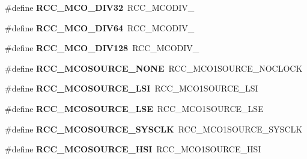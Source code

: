 \begin{DoxyCompactItemize}
\#define {\bfseries R\+C\+C\+\_\+\+M\+C\+O\+\_\+\+D\+I\+V32}~R\+C\+C\+\_\+\+M\+C\+O\+D\+I\+V\+\_
\item 
\mbox{\label{group___h_a_l___r_c_c___aliased_ga3e2f0bbc95937a013cdb3cc6bec61fe8}} 
\#define {\bfseries R\+C\+C\+\_\+\+M\+C\+O\+\_\+\+D\+I\+V64}~R\+C\+C\+\_\+\+M\+C\+O\+D\+I\+V\+\_
\item 
\mbox{\label{group___h_a_l___r_c_c___aliased_ga13db6fb3b4264a8fff9f671faf393f1b}} 
\#define {\bfseries R\+C\+C\+\_\+\+M\+C\+O\+\_\+\+D\+I\+V128}~R\+C\+C\+\_\+\+M\+C\+O\+D\+I\+V\+\_
\item 
\mbox{\label{group___h_a_l___r_c_c___aliased_ga55362c6bb39a405d997b64cf8db9709e}} 
\#define {\bfseries R\+C\+C\+\_\+\+M\+C\+O\+S\+O\+U\+R\+C\+E\+\_\+\+N\+O\+NE}~R\+C\+C\+\_\+\+M\+C\+O1\+S\+O\+U\+R\+C\+E\+\_\+\+N\+O\+C\+L\+O\+CK
\item 
\mbox{\label{group___h_a_l___r_c_c___aliased_ga71ac33c61f4246489cc1c34bebe9b45d}} 
\#define {\bfseries R\+C\+C\+\_\+\+M\+C\+O\+S\+O\+U\+R\+C\+E\+\_\+\+L\+SI}~R\+C\+C\+\_\+\+M\+C\+O1\+S\+O\+U\+R\+C\+E\+\_\+\+L\+SI
\item 
\mbox{\label{group___h_a_l___r_c_c___aliased_ga830cfeba85393f5a5a2743ad0f373834}} 
\#define {\bfseries R\+C\+C\+\_\+\+M\+C\+O\+S\+O\+U\+R\+C\+E\+\_\+\+L\+SE}~R\+C\+C\+\_\+\+M\+C\+O1\+S\+O\+U\+R\+C\+E\+\_\+\+L\+SE
\item 
\mbox{\label{group___h_a_l___r_c_c___aliased_ga250215c0f82d63c001f1a19f6baeaee4}} 
\#define {\bfseries R\+C\+C\+\_\+\+M\+C\+O\+S\+O\+U\+R\+C\+E\+\_\+\+S\+Y\+S\+C\+LK}~R\+C\+C\+\_\+\+M\+C\+O1\+S\+O\+U\+R\+C\+E\+\_\+\+S\+Y\+S\+C\+LK
\item 
\mbox{\label{group___h_a_l___r_c_c___aliased_gaf76c21fc91d02a5006b1ad20bb09fb59}} 
\#define {\bfseries R\+C\+C\+\_\+\+M\+C\+O\+S\+O\+U\+R\+C\+E\+\_\+\+H\+SI}~R\+C\+C\+\_\+\+M\+C\+O1\+S\+O\+U\+R\+C\+E\+\_\+\+H\+SI
\item 
\mbox{\label{group___h_a_l___r_c_c___aliased_gaf44dc4cc77e850c96fc1fee93a74a838}} 

\end{DoxyCompactItemize}
